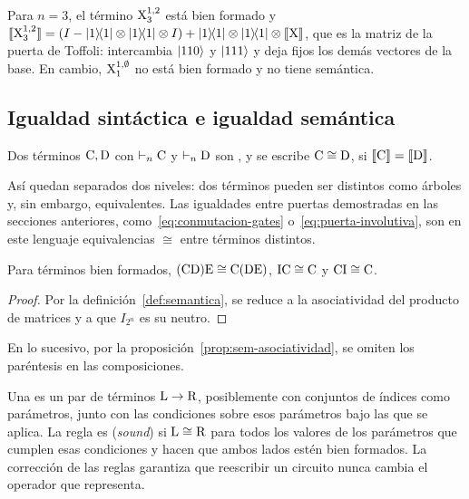 \begin{example}
  Para $n=3$, el término $\text{X}^{1,2}_{3}$ está bien formado y
  $\sem{\stategate{X}{1,2}{3}}=(I-\dyad{1}\tensor\dyad{1}\tensor I)+\dyad{1}\tensor\dyad{1}\tensor\sem{\gate{X}}$,
  que es la matriz de la puerta de Toffoli: intercambia $\ket{110}$ y $\ket{111}$ y deja fijos los demás vectores de la base. En cambio, $\text{X}^{1,\emptyset}_{1}$ no está bien formado y no tiene semántica.
\end{example}

\subsection{Igualdad sintáctica e igualdad semántica}

\begin{definition}
  \label{def:equivalencia}
  Dos términos $\text{C},\text{D}$ con $\vdash_n\text{C}$ y $\vdash_n\text{D}$ son , y se escribe $\text{C}\cong\text{D}$, si $\llbracket \text{C}\rrbracket=\llbracket \text{D}\rrbracket$.
\end{definition}

Así quedan separados dos niveles: dos términos pueden ser distintos como árboles y, sin embargo, equivalentes. Las igualdades entre puertas demostradas en las secciones anteriores, como~\eqref{eq:conmutacion-gates} o~\eqref{eq:puerta-involutiva}, son en este lenguaje equivalencias $\cong$ entre términos distintos.

\begin{proposition}
  \label{prop:sem-asociatividad}
  Para términos bien formados, $(\text{C}\text{D})\text{E}\cong\text{C}(\text{D}\text{E})$, $\text{I}\text{C}\cong\text{C}$ y $\text{C}\text{I}\cong\text{C}$.
\end{proposition}
\begin{proof}
  Por la definición~\ref{def:semantica}, se reduce a la asociatividad del producto de matrices y a que $I_{2^n}$ es su neutro.
\end{proof}

En lo sucesivo, por la proposición~\ref{prop:sem-asociatividad}, se omiten los paréntesis en las composiciones.

Una  es un par de términos $\text{L}\to\text{R}$, posiblemente con conjuntos de índices como parámetros, junto con las condiciones sobre esos parámetros bajo las que se aplica. La regla es  (\emph{sound}) si $\text{L}\cong\text{R}$ para todos los valores de los parámetros que cumplen esas condiciones y hacen que ambos lados estén bien formados. La corrección de las reglas garantiza que reescribir un circuito nunca cambia el operador que representa.

